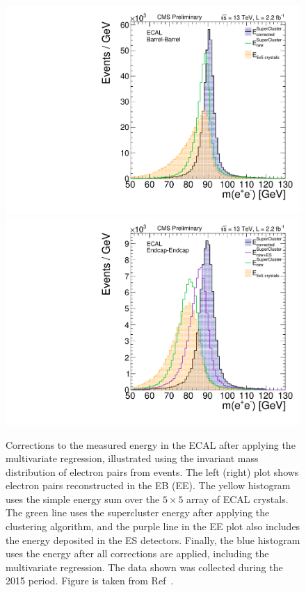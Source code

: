 \begin{figure}
  \centering
  \includegraphics[width=.49\textwidth]{Figures/cms/zee_mass_bb.pdf}
  \includegraphics[width=.49\textwidth]{Figures/cms/zee_mass_ee.pdf}
  \caption[Impact of the shower energy reconstruction]
  {
    Corrections to the measured energy in the ECAL after applying the multivariate regression, illustrated using the invariant mass distribution of electron pairs from \Zee events. The left (right) plot shows electron pairs reconstructed in the EB (EE). The yellow histogram uses the simple energy sum over the $5\times5$ array of ECAL crystals. The green line uses the supercluster energy after applying the clustering algorithm, and the purple line in the EE plot also includes the energy deposited in the ES detectors. Finally, the blue histogram uses the energy after all corrections are applied, including the multivariate regression. The data shown was collected during the 2015 period. Figure is taken from Ref~\cite{CMS-DP-2015-057}.
  }
  \label{fig:shower_energy_reconstruction}
\end{figure}

